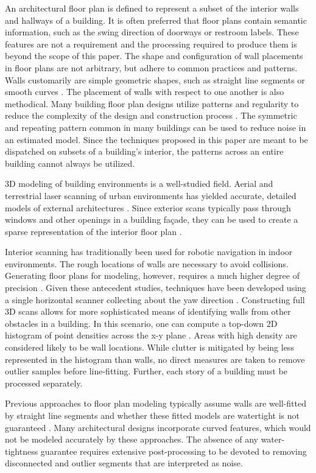 \documentclass[10pt,twocolumn,letterpaper]{article}
\begin{document}
An architectural floor plan is defined to represent a subset of the interior walls and hallways of a building.  It is often preferred that floor plans contain semantic information, such as the swing direction of doorways or restroom labels.  These features are not a requirement and the processing required to produce them is beyond the scope of this paper.  The shape and configuration of wall placements in floor plans are  not arbitrary, but adhere to common practices and patterns.  Walls customarily are simple geometric shapes, such as straight line segments or smooth curves \cite{Tang10}.  The placement of walls with respect to one another is also methodical.  Many building floor plan designs utilize patterns and regularity to reduce the complexity of the design and construction process \cite{Galle81}. The symmetric and repeating pattern common in many buildings can be used to reduce noise in an estimated model.  Since the techniques proposed in this paper are meant to be dispatched on subsets of a building's interior, the patterns across an entire building cannot always be utilized.

3D modeling of building environments is a well-studied field.  Aerial and terrestrial laser scanning of urban environments has yielded accurate, detailed models of external architectures \cite{Rottensteiner02, Zakhor07}.  Since exterior scans typically pass through windows and other openings in a building fa\c{c}ade, they can be used to create a sparse representation of the interior floor plan \cite{Johnston08}.

Interior scanning has traditionally been used for robotic navigation in indoor environments.  The rough locations of walls are necessary to avoid collisions.  Generating floor plans for modeling, however, requires a much higher degree of precision \cite{Okorn09}.  Given these antecedent studies, techniques have been developed using a single horizontal scanner collecting about the yaw direction \cite{Weiss05}.  Constructing full 3D scans allows for more sophisticated means of identifying walls from other obstacles in a building.  In this scenario, one can compute a top-down 2D histogram of point densities across the x-y plane \cite{Okorn09}.  Areas with high density are considered likely to be wall locations.  While clutter is mitigated by being less represented in the histogram than walls, no direct measures are taken to remove outlier samples before line-fitting.  Further, each story of a building must be processed separately.

Previous approaches to floor plan modeling typically assume walls are well-fitted by straight line segments and whether these fitted models are watertight is not guaranteed \cite{Nuchter03, Okorn09, Weiss05}.  Many architectural designs incorporate curved features, which would not be modeled accurately by these approaches. The absence of any water-tightness guarantee requires extensive post-processing to be devoted to removing disconnected and outlier segments that are interpreted as noise.
\end{document}

